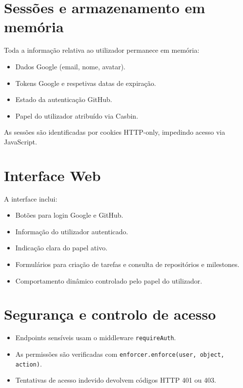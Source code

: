 \section{Sessões e armazenamento em memória}

Toda a informação relativa ao utilizador permanece em memória:

\begin{itemize}
    \item Dados Google (email, nome, avatar).
    \item Tokens Google e respetivas datas de expiração.
    \item Estado da autenticação GitHub.
    \item Papel do utilizador atribuído via Casbin.
\end{itemize}

As sessões são identificadas por cookies HTTP-only, impedindo acesso via JavaScript.

\section{Interface Web}

A interface inclui:

\begin{itemize}
    \item Botões para login Google e GitHub.
    \item Informação do utilizador autenticado.
    \item Indicação clara do papel ativo.
    \item Formulários para criação de tarefas e consulta de repositórios e milestones.
    \item Comportamento dinâmico controlado pelo papel do utilizador.
\end{itemize}

\section{Segurança e controlo de acesso}

\begin{itemize}
    \item Endpoints sensíveis usam o middleware \texttt{requireAuth}.
    \item As permissões são verificadas com \texttt{enforcer.enforce(user, object, action)}.
    \item Tentativas de acesso indevido devolvem códigos HTTP 401 ou 403.
\end{itemize}

